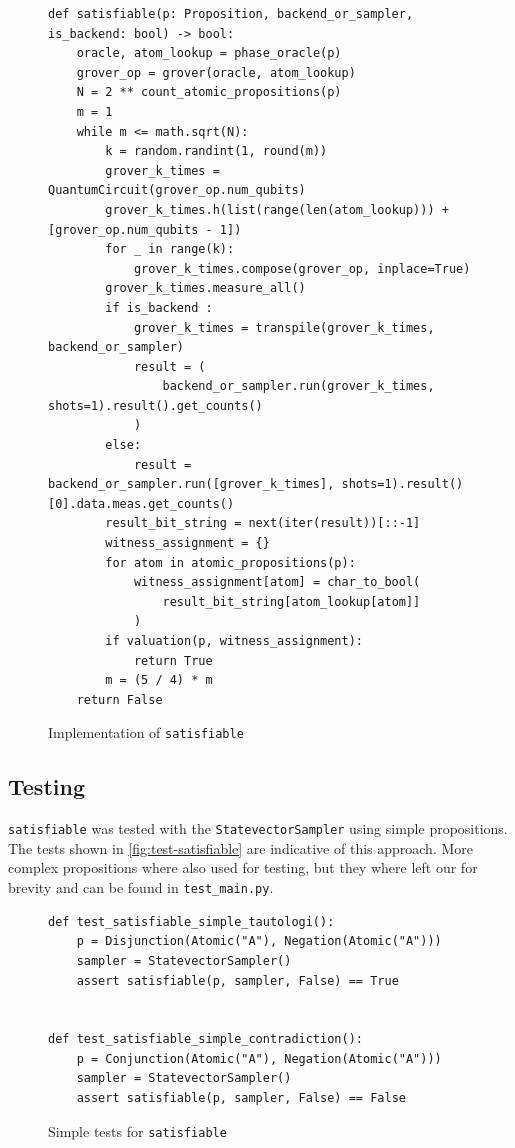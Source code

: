 \begin{figure}[H]
\centering
\begin{verbatim}
def satisfiable(p: Proposition, backend_or_sampler, is_backend: bool) -> bool:
    oracle, atom_lookup = phase_oracle(p)
    grover_op = grover(oracle, atom_lookup)
    N = 2 ** count_atomic_propositions(p)
    m = 1
    while m <= math.sqrt(N):
        k = random.randint(1, round(m))
        grover_k_times = QuantumCircuit(grover_op.num_qubits)
        grover_k_times.h(list(range(len(atom_lookup))) + [grover_op.num_qubits - 1])
        for _ in range(k):
            grover_k_times.compose(grover_op, inplace=True)
        grover_k_times.measure_all()
        if is_backend :
            grover_k_times = transpile(grover_k_times, backend_or_sampler)
            result = (
                backend_or_sampler.run(grover_k_times, shots=1).result().get_counts()
            )
        else:
            result = backend_or_sampler.run([grover_k_times], shots=1).result()[0].data.meas.get_counts()
        result_bit_string = next(iter(result))[::-1]
        witness_assignment = {}
        for atom in atomic_propositions(p):
            witness_assignment[atom] = char_to_bool(
                result_bit_string[atom_lookup[atom]]
            )
        if valuation(p, witness_assignment):
            return True
        m = (5 / 4) * m
    return False
\end{verbatim}
\caption{Implementation of \texttt{satisfiable} }
\label{fig:satisfiable}
\end{figure}

\subsection{Testing}\label{subsec:testing}

\texttt{satisfiable} was tested with the \texttt{StatevectorSampler} using simple propositions.
The tests shown in \autoref{fig:test-satisfiable} are indicative of this approach.
More complex propositions where also used for testing, but they where left our for brevity and can be found in \texttt{test\_main.py}.

\begin{figure}[H]
\centering
\begin{verbatim}
def test_satisfiable_simple_tautologi():
    p = Disjunction(Atomic("A"), Negation(Atomic("A")))
    sampler = StatevectorSampler()
    assert satisfiable(p, sampler, False) == True


def test_satisfiable_simple_contradiction():
    p = Conjunction(Atomic("A"), Negation(Atomic("A")))
    sampler = StatevectorSampler()
    assert satisfiable(p, sampler, False) == False
\end{verbatim}
\caption{Simple tests for \texttt{satisfiable}}
\label{fig:test-satisfiable}
\end{figure}

